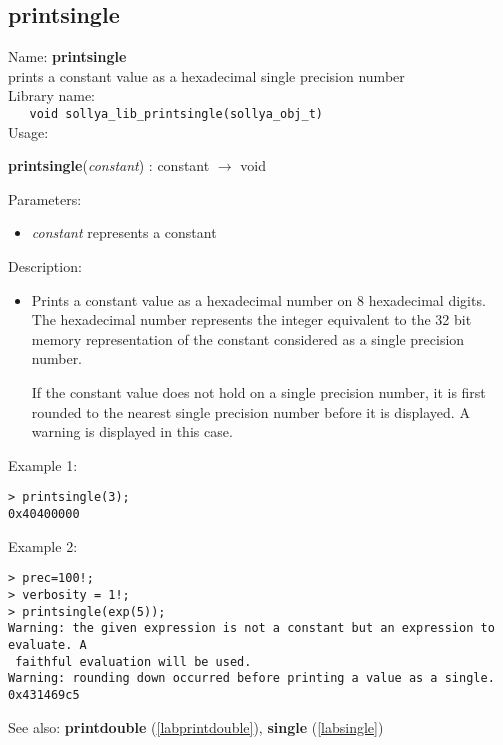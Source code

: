 \subsection{printsingle}
\label{labprintsingle}
\noindent Name: \textbf{printsingle}\\
\phantom{aaa}prints a constant value as a hexadecimal single precision number\\[0.2cm]
\noindent Library name:\\
\verb|   void sollya_lib_printsingle(sollya_obj_t)|\\[0.2cm]
\noindent Usage: 
\begin{center}
\textbf{printsingle}(\emph{constant}) : \textsf{constant} $\rightarrow$ \textsf{void}\\
\end{center}
Parameters: 
\begin{itemize}
\item \emph{constant} represents a constant
\end{itemize}
\noindent Description: \begin{itemize}

\item Prints a constant value as a hexadecimal number on 8 hexadecimal
   digits. The hexadecimal number represents the integer equivalent to
   the 32 bit memory representation of the constant considered as a
   single precision number.
    
   If the constant value does not hold on a single precision number, it
   is first rounded to the nearest single precision number before it is
   displayed. A warning is displayed in this case.
\end{itemize}
\noindent Example 1: 
\begin{center}\begin{minipage}{15cm}\begin{Verbatim}[frame=single]
> printsingle(3);
0x40400000
\end{Verbatim}
\end{minipage}\end{center}
\noindent Example 2: 
\begin{center}\begin{minipage}{15cm}\begin{Verbatim}[frame=single]
> prec=100!;
> verbosity = 1!;
> printsingle(exp(5));
Warning: the given expression is not a constant but an expression to evaluate. A
 faithful evaluation will be used.
Warning: rounding down occurred before printing a value as a single.
0x431469c5
\end{Verbatim}
\end{minipage}\end{center}
See also: \textbf{printdouble} (\ref{labprintdouble}), \textbf{single} (\ref{labsingle})
